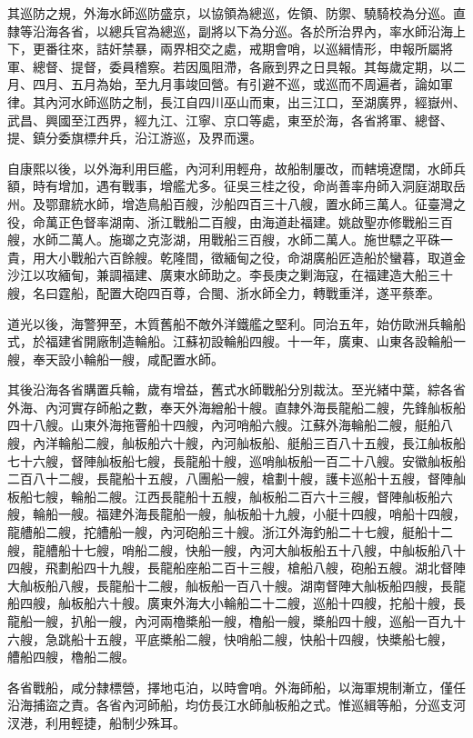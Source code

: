 \begin{pinyinscope}
其巡防之規，外海水師巡防盛京，以協領為總巡，佐領、防禦、驍騎校為分巡。直隸等沿海各省，以總兵官為總巡，副將以下為分巡。各於所治界內，率水師沿海上下，更番往來，詰奸禁暴，兩界相交之處，戒期會哨，以巡緝情形，申報所屬將軍、總督、提督，委員稽察。若因風阻滯，各廠到界之日具報。其每歲定期，以二月、四月、五月為始，至九月事竣回營。有引避不巡，或巡而不周遍者，論如軍律。其內河水師巡防之制，長江自四川巫山而東，出三江口，至湖廣界，經嶽州、武昌、興國至江西界，經九江、江寧、京口等處，東至於海，各省將軍、總督、提、鎮分委旗標弁兵，沿江游巡，及界而還。

自康熙以後，以外海利用巨艦，內河利用輕舟，故船制屢改，而轄境遼闊，水師兵額，時有增加，遇有戰事，增艦尤多。征吳三桂之役，命尚善率舟師入洞庭湖取岳州。及鄂鼐統水師，增造鳥船百艘，沙船四百三十八艘，置水師三萬人。征臺灣之役，命萬正色督率湖南、浙江戰船二百艘，由海道赴福建。姚啟聖亦修戰船三百艘，水師二萬人。施瑯之克澎湖，用戰船三百艘，水師二萬人。施世驃之平硃一貴，用大小戰船六百餘艘。乾隆間，徵緬甸之役，命湖廣船匠造船於蠻暮，取道金沙江以攻緬甸，兼調福建、廣東水師助之。李長庚之剿海寇，在福建造大船三十艘，名曰霆船，配置大砲四百尊，合閩、浙水師全力，轉戰重洋，遂平蔡牽。

道光以後，海警狎至，木質舊船不敵外洋鐵艦之堅利。同治五年，始仿歐洲兵輪船式，於福建省開廠制造輪船。江蘇初設輪船四艘。十一年，廣東、山東各設輪船一艘，奉天設小輪船一艘，咸配置水師。

其後沿海各省購置兵輪，歲有增益，舊式水師戰船分別裁汰。至光緒中葉，綜各省外海、內河實存師船之數，奉天外海繒船十艘。直隸外海長龍船二艘，先鋒舢板船四十八艘。山東外海拖罾船十四艘，內河哨船六艘。江蘇外海輪船二艘，艇船八艘，內洋輪船二艘，舢板船六十艘，內河舢板船、艇船三百八十五艘，長江舢板船七十六艘，督陣舢板船七艘，長龍船十艘，巡哨舢板船一百二十八艘。安徽舢板船二百八十二艘，長龍船十五艘，八團船一艘，槍劃十艘，護卡巡船十五艘，督陣舢板船七艘，輪船二艘。江西長龍船十五艘，舢板船二百六十三艘，督陣舢板船六艘，輪船一艘。福建外海長龍船一艘，舢板船十九艘，小艇十四艘，哨船十四艘，龍艚船二艘，拕艚船一艘，內河砲船三十艘。浙江外海釣船二十七艘，艇船十二艘，龍艚船十七艘，哨船二艘，快船一艘，內河大舢板船五十八艘，中舢板船八十四艘，飛劃船四十九艘，長龍船座船二百十三艘，槍船八艘，砲船五艘。湖北督陣大舢板船八艘，長龍船十二艘，舢板船一百八十艘。湖南督陣大舢板船四艘，長龍船四艘，舢板船六十艘。廣東外海大小輪船二十二艘，巡船十四艘，拕船十艘，長龍船一艘，扒船一艘，內河兩櫓槳船一艘，櫓船一艘，槳船四十艘，巡船一百九十六艘，急跳船十五艘，平底槳船二艘，快哨船二艘，快船十四艘，快槳船七艘，艚船四艘，櫓船二艘。

各省戰船，咸分隸標營，擇地屯泊，以時會哨。外海師船，以海軍規制漸立，僅任沿海捕盜之責。各省內河師船，均仿長江水師舢板船之式。惟巡緝等船，分巡支河汊港，利用輕捷，船制少殊耳。


\end{pinyinscope}
